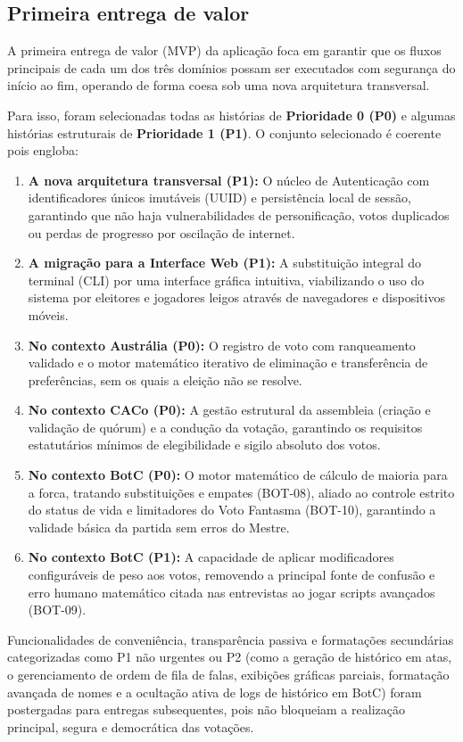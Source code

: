 \documentclass[12pt,a4paper]{article}
\begin{document}
\subsection{Primeira entrega de valor}

A primeira entrega de valor (MVP) da aplicação foca em garantir que os fluxos principais de cada um dos três domínios possam ser executados com segurança do início ao fim, operando de forma coesa sob uma nova arquitetura transversal.

Para isso, foram selecionadas todas as histórias de \textbf{Prioridade 0 (P0)} e algumas histórias estruturais de \textbf{Prioridade 1 (P1)}. O conjunto selecionado é coerente pois engloba:

\begin{enumerate}
\item \textbf{A nova arquitetura transversal (P1):} O núcleo de Autenticação com identificadores únicos imutáveis (UUID) e persistência local de sessão, garantindo que não haja vulnerabilidades de personificação, votos duplicados ou perdas de progresso por oscilação de internet.
\item \textbf{A migração para a Interface Web (P1):} A substituição integral do terminal (CLI) por uma interface gráfica intuitiva, viabilizando o uso do sistema por eleitores e jogadores leigos através de navegadores e dispositivos móveis.
\item \textbf{No contexto Austrália (P0):} O registro de voto com ranqueamento validado e o motor matemático iterativo de eliminação e transferência de preferências, sem os quais a eleição não se resolve.
\item \textbf{No contexto CACo (P0):} A gestão estrutural da assembleia (criação e validação de quórum) e a condução da votação, garantindo os requisitos estatutários mínimos de elegibilidade e sigilo absoluto dos votos.
\item \textbf{No contexto BotC (P0):} O motor matemático de cálculo de maioria para a forca, tratando substituições e empates (BOT-08), aliado ao controle estrito do status de vida e limitadores do Voto Fantasma (BOT-10), garantindo a validade básica da partida sem erros do Mestre.
\item \textbf{No contexto BotC (P1):} A capacidade de aplicar modificadores configuráveis de peso aos votos, removendo a principal fonte de confusão e erro humano matemático citada nas entrevistas ao jogar scripts avançados (BOT-09).
\end{enumerate}

Funcionalidades de conveniência, transparência passiva e formatações secundárias categorizadas como P1 não urgentes ou P2 (como a geração de histórico em atas, o gerenciamento de ordem de fila de falas, exibições gráficas parciais, formatação avançada de nomes e a ocultação ativa de logs de histórico em BotC) foram postergadas para entregas subsequentes, pois não bloqueiam a realização principal, segura e democrática das votações.

\clearpage
\end{document}
